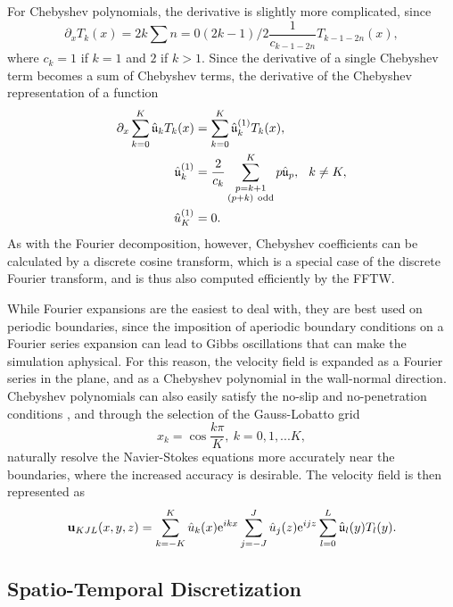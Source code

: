 For Chebyshev polynomials, the derivative is slightly more complicated, since 
\begin{equation}
\partial_x T_k(x) = 2k\sum{n=0}{(2k-1)/2}{\frac{1}{c_{k-1-2n}} T_{k-1-2n}(x)},
\end{equation}
where $c_k = 1$ if $k=1$ and $2$ if $k > 1$. Since the derivative of a single Chebyshev term becomes a sum of Chebyshev terms, the derivative of the Chebyshev representation of a function 
\begin{align}
\partial_x \sum{k=0}{K}\hat{\mathfrak{u}}_kT_k(x) &= \sum{k=0}{K}\hat{\mathfrak{u}}_k^{(1)}T_k(x),\\
\hat{\mathfrak{u}}_k^{(1)} &= \frac{2}{c_k}\sum{\substack{p = k+1\\(p+k) \mathrm{~odd}}}{K} p \hat{\mathfrak{u}}_p, \hspace{0.25cm} k \neq K,\\
\hat{u}^{(1)}_K &= 0.
\end{align}
As with the Fourier decomposition, however, Chebyshev coefficients can be calculated by a discrete cosine transform, which is a special case of the discrete Fourier transform, and is thus also computed efficiently by the FFTW. 

While Fourier expansions are the easiest to deal with, they are best used on periodic boundaries, since the imposition of aperiodic boundary conditions on a Fourier series expansion can lead to Gibbs oscillations that can make the simulation aphysical. For this reason, the velocity field is expanded as a Fourier series in the plane, and as a Chebyshev polynomial in the wall-normal direction. Chebyshev polynomials can also easily satisfy the no-slip and no-penetration conditions , and through the selection of the Gauss-Lobatto grid
\begin{equation}
x_{k} = \cos{\dfrac{k\pi}{K}},~k = 0,1,...K,
\end{equation}
naturally resolve the Navier-Stokes equations more accurately near the boundaries, where the increased accuracy is desirable. The velocity field is then represented as 
\begin{equation}
\Vector{u}_{KJL}(x,y,z) = \sum{k=-K}{K}{\hat{u}_k(x)\exp{ikx}}\sum{j=-J}{J}{\hat{u}_j(z)\exp{ijz}}\sum{l=0}{L}{\hat{\mathfrak{u}}_l(y)T_l(y)}.
\end{equation}

\subsection{Spatio-Temporal Discretization} 

